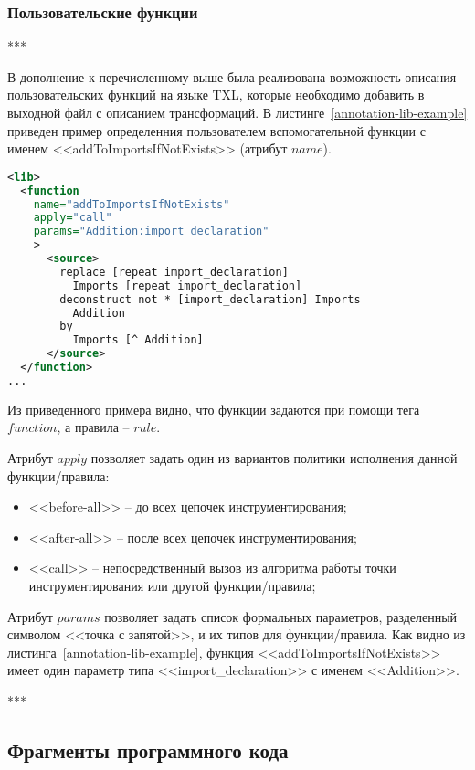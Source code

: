 \subsubsection{Пользовательские функции}

***

В дополнение к перечисленному выше была реализована возможность описания пользовательских функций на языке TXL, которые необходимо добавить в выходной файл с описанием трансформаций.
В листинге~\ref{annotation-lib-example} приведен пример определенния пользователем вспомогательной функции с именем <<addToImportsIfNotExists>> (атрибут $name$).

\begin{lstlisting}[frame=single, language=XML, label={annotation-lib-example}, caption={Пример описания вспомогательной функции}]
<lib>
  <function
    name="addToImportsIfNotExists"
    apply="call"
    params="Addition:import_declaration"
    >
      <source>
        replace [repeat import_declaration]
          Imports [repeat import_declaration]
        deconstruct not * [import_declaration] Imports
          Addition
        by
          Imports [^ Addition]
      </source>
  </function>
...
\end{lstlisting}

Из приведенного примера видно, что функции задаются при помощи тега $function$, а правила -- $rule$.

Атрибут $apply$ позволяет задать один из вариантов политики исполнения данной функции/правила:
\begin{itemize}[noitemsep]
  \item <<before-all>>  -- до всех цепочек инструментирования;
  \item <<after-all>>   -- после всех цепочек инструментирования;
  \item <<call>>        -- непосредственный вызов из алгоритма работы точки инструментирования или другой функции/правила;
\end{itemize}

Атрибут $params$ позволяет задать список формальных параметров, разделенный символом <<точка с запятой>>, и их типов для функции/правила.
Как видно из листинга~\ref{annotation-lib-example}, функция <<addToImportsIfNotExists>> имеет один параметр типа <<import\_declaration>> с именем <<Addition>>.

***

\subsection{Фрагменты программного кода}

